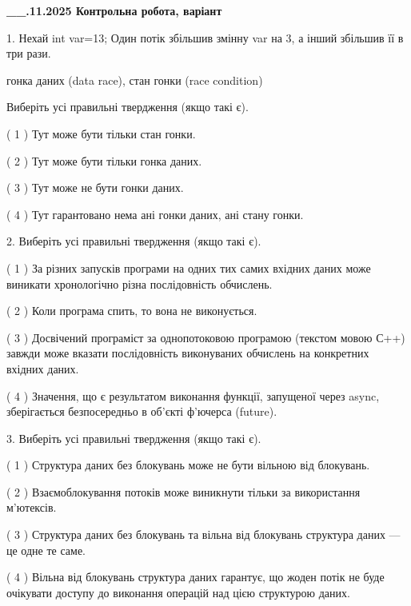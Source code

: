 \documentclass[12pt, ukrainian]{article}
\begin{document}
\newpage
\begin {large}

\textbf{\_\_.11.2025 Контрольна робота, варіант  }\par


{
1. Нехай int var=13; Один потік збільшив змінну var на 3, а інший збільшив її в три рази.

гонка даних (data race), стан гонки (race condition)

Виберіть усі правильні твердження (якщо такі є).\par
\vspace{2mm}
( 1 ) Тут може бути тільки стан гонки.%

( 2 ) Тут може бути тільки гонка даних.%

( 3 ) Тут може не бути гонки даних.%

( 4 ) Тут гарантовано нема ані гонки даних, ані стану гонки.%


2. Виберіть усі правильні твердження (якщо такі є).\par
\vspace{2mm}

( 1 ) За різних запусків програми на одних тих самих вхідних даних може виникати хронологічно різна послідовність обчислень.%

( 2 ) Коли програма спить, то вона не виконується.%

( 3 ) Досвічений програміст за однопотоковою програмою (текстом мовою С++) завжди може вказати послідовність виконуваних обчислень на конкретних вхідних даних.%

( 4 ) Значення, що є результатом виконання функції, запущеної через async, зберігається безпосередньо в об’єкті ф’ючерса (future).%


3. Виберіть усі правильні твердження (якщо такі є).\par
\vspace{2mm}

( 1 ) Структура даних без блокувань може не бути вільною від блокувань.%

( 2 ) Взаємоблокування потоків може виникнути тільки за використання м’ютексів.%

( 3 ) Структура даних без блокувань та вільна від блокувань структура даних --- це одне те саме.%

( 4 ) Вільна від блокувань структура даних гарантує, що жоден потік не буде очікувати доступу до виконання операцій над цією структурою даних.%


}
\end{large}
\end{document}
